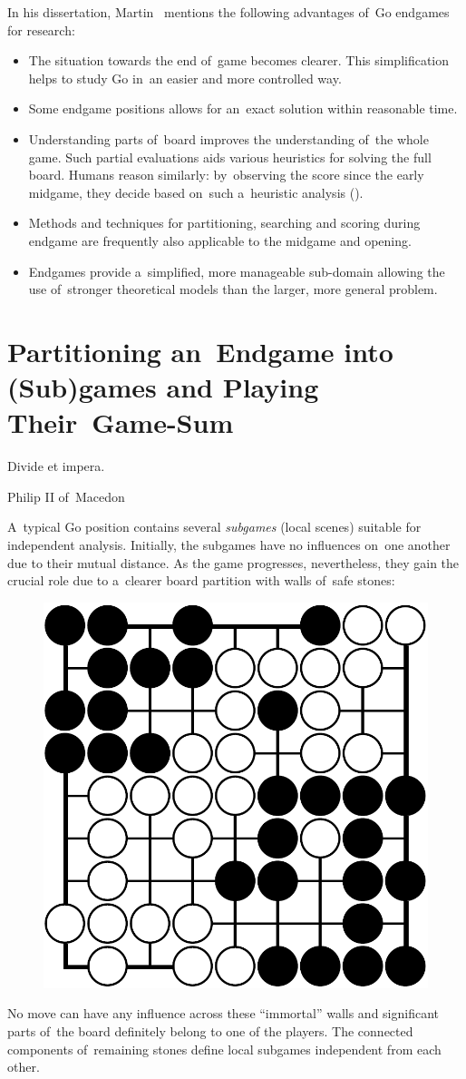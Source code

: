 In his dissertation, Martin~\Mueller{} mentions the following advantages of~Go endgames for research:
\begin{itemize}
  \item The situation towards the end of~game becomes clearer.
    This simplification helps to study Go in~an easier and more controlled way.
  \item Some endgame positions allows for an~exact solution within reasonable time.
  \item Understanding parts of~board improves the understanding of~the whole game.
    Such partial evaluations aids various heuristics for solving the full board.
    Humans reason similarly: by~observing the score since the early midgame, they decide based on~such a~heuristic analysis (\cite{Takagawa85}).
  \item Methods and techniques for partitioning, searching and scoring during endgame are frequently also applicable to the midgame and opening.
  \item Endgames provide a~simplified, more manageable sub-domain allowing the use of~stronger theoretical models than the larger, more general problem.
\end{itemize}

\section{Partitioning an~Endgame into (Sub)games and Playing Their~Game-Sum}
{
  \setlength{\epigraphwidth}{0.4\textwidth}
  \epigraph{
    Divide et impera.
  }{Philip II of~Macedon}
}%
A~typical Go position contains several \emph{subgames} (local scenes) suitable for independent analysis.
Initially, the subgames have no influences on~one another due to their mutual distance.
As the game progresses, nevertheless, they gain the crucial role due to a~clearer board partition with walls of~safe stones:
\begin{figure}[H]
  \centering
  \includegraphics[width=.4\textwidth]{../img/late_endgame_Go_position_suited_for_exact_analysis.png}
  \label{fig:immortal-wall}
\end{figure}
No move can have any influence across these ``immortal'' walls and significant parts of~the board definitely belong to one of the players.
The connected components of~remaining stones define local subgames independent from each other.

